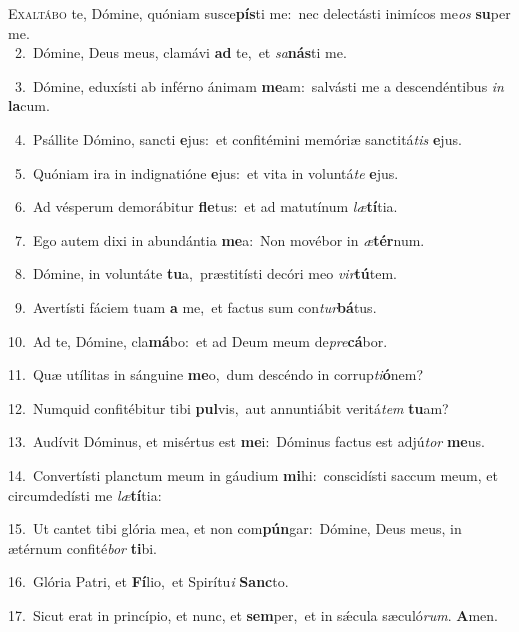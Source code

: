 \lettrine{\initial\textcolor{\initialcolor}{E}}{xaltábo} te, Dómine, quóniam susce\-\textbf{pís}\-ti me:~\star nec delectásti inimícos me\textit{os} \textbf{su}\-per me.\\
{\numbfont\textcolor{\numbcolor}{~2.}}~Dómine, Deus meus, clamávi \textbf{ad} te,~\star et \textit{sa}\-\textbf{nás}ti me.\par
{\numbfont\textcolor{\numbcolor}{~3.}}~Dómine, eduxísti ab inférno ánimam \textbf{me}\-am:~\star salvásti me a descendéntibus \textit{in} \textbf{la}\-cum.\par
{\numbfont\textcolor{\numbcolor}{~4.}}~Psállite Dómino, sancti \textbf{e}\-jus:~\star et confitémini memóriæ sanctitá\textit{tis} \textbf{e}\-jus.\par
{\numbfont\textcolor{\numbcolor}{~5.}}~Quóniam ira in indignatióne \textbf{e}\-jus:~\star et vita in voluntá\textit{te} \textbf{e}\-jus.\par
{\numbfont\textcolor{\numbcolor}{~6.}}~Ad vésperum demorábitur \textbf{fle}\-tus:~\star et ad matutínum \textit{læ}\-\textbf{tí}tia.\par
{\numbfont\textcolor{\numbcolor}{~7.}}~Ego autem dixi in abundántia \textbf{me}\-a:~\star Non movébor in \textit{æ}\-\textbf{tér}num.\par
{\numbfont\textcolor{\numbcolor}{~8.}}~Dómine, in voluntáte \textbf{tu}\-a,~\star præstitísti decóri meo \textit{vir}\-\textbf{tú}tem.\par
{\numbfont\textcolor{\numbcolor}{~9.}}~Avertísti fáciem tuam \textbf{a} me,~\star et factus sum con\-\textit{tur}\-\textbf{bá}tus.\par
{\numbfont\textcolor{\numbcolor}{10.}}~Ad te, Dómine, cla\-\textbf{má}\-bo:~\star et ad Deum meum de\-\textit{pre}\-\textbf{cá}bor.\par
{\numbfont\textcolor{\numbcolor}{11.}}~Quæ utílitas in sánguine \textbf{me}\-o,~\star dum descéndo in corrup\-\textit{ti}\-\textbf{ó}nem?\par
{\numbfont\textcolor{\numbcolor}{12.}}~Numquid confitébitur tibi \textbf{pul}\-vis,~\star aut annuntiábit veritá\textit{tem} \textbf{tu}\-am?\par
{\numbfont\textcolor{\numbcolor}{13.}}~Audívit Dóminus, et misértus est \textbf{me}\-i:~\star Dóminus factus est adjú\textit{tor} \textbf{me}\-us.\par
{\numbfont\textcolor{\numbcolor}{14.}}~Convertísti planctum meum in gáudium \textbf{mi}\-hi:~\star conscidísti saccum meum, et circumdedísti me \textit{læ}\-\textbf{tí}tia:\par
{\numbfont\textcolor{\numbcolor}{15.}}~Ut cantet tibi glória mea, et non com\-\textbf{pún}\-gar:~\star Dómine, Deus meus, in ætérnum confité\textit{bor} \textbf{ti}\-bi.\par
{\numbfont\textcolor{\numbcolor}{16.}}~Glória Patri, et \textbf{Fí}\-lio,~\star et Spirítu\textit{i} \textbf{Sanc}\-to.\par
{\numbfont\textcolor{\numbcolor}{17.}}~Sicut erat in princípio, et nunc, et \textbf{sem}\-per,~\star et in sǽcula sæculó\-\textit{rum}\-. \textbf{A}\-men.\par

